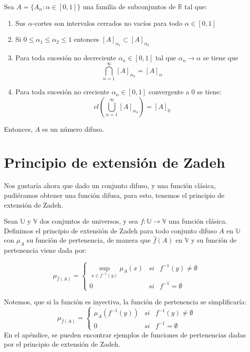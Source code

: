\begin{teorema}
	Sea $A=\{A_\alpha : \alpha \in [0, 1]\}$ una familia de subconjuntos de $\mathbb{R}$ tal que:
	
	\begin{enumerate}
		\item Sus $\alpha$-cortes son intervalos cerrados no vacíos para todo $\alpha \in [0, 1]$
		\item Si $0 \leq \alpha_1 \leq \alpha_2 \leq 1$ entonces $[A]_{\alpha_1} \subset [A]_{\alpha_2}$
		\item Para toda sucesión no decreciente $\alpha_n \in [0, 1]$ tal que $\alpha_n \longrightarrow \alpha$ se tiene que
		$$
		\bigcap^\infty_{n=1} [A]_{\alpha_n}=[A]_\alpha
		$$
		\item Para toda sucesión no creciente $\alpha_n \in [0, 1]$ convergente a $0$ se tiene:
		$$
		cl\left(\bigcup^\infty_{n=1} [A]_{\alpha_n}\right)=[A]_0
		$$
	\end{enumerate}
	Entonces, $A$ es un número difuso.
\end{teorema}

\section{Principio de extensión de Zadeh}
Nos gustaría ahora que dado un conjunto difuso, y una función clásica, pudiéramos obtener una función difusa, para esto, tenemos el principio de extensión de Zadeh.

\begin{definicion}
	Sean $\mathbb{U}$ y $\mathbb{V}$ dos conjuntos de universos, y sea $f: \mathbb{U} \longrightarrow \mathbb{V}$ una función clásica. Definimos el principio de extensión de Zadeh para todo conjunto difuso $A$ en $\mathbb{U}$ con $\mu_A$ su función de pertenencia, de manera que $\hat{f}(A)$ en $\mathbb{V}$ y su función de pertenencia viene dada por:
	
	$$
		\mu_{\hat{f}(A)}=\left\{
			\begin{array}{ccc}
				\sup_{x\in f^{-1}(y)} \mu_A(x) & si & f^{-1}(y)\neq\emptyset\\
				0 & si & f^{-1}=\emptyset
			\end{array}
		\right.
	$$
\end{definicion}


Notemos, que si la función es inyectiva, la función de pertenencia se simplificaría:
$$
	\mu_{\hat{f}(A)}=\left\{
		\begin{array}{ccc}
			\mu_A(f^{-1}(y)) & si & f^{-1}(y)\neq\emptyset\\
			0 & si & f^{-1}=\emptyset
		\end{array}
	\right.
$$
En el apéndice, se pueden encontrar ejemplos de funciones de pertenencias dadas por el principio de extensión de Zadeh.

